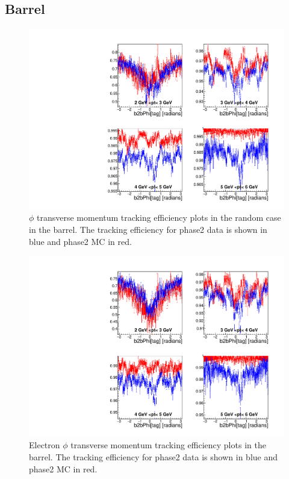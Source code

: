 \documentclass[a4paper,11pt,twosided,final,german,openbib,pdftex,listof=totoc,bibliography=totoc]{scrbook}
\begin{document}
\newpage



\subsection{Barrel}





\begin{figure}[!htbp]
	\centering
	\includegraphics[width=\textwidth]{Plots/master/xPtMPhiRandomBarrel}
	\caption[Transverse Momentum $\phi$ Random Barrel Efficiency Phase2]{$\phi$ transverse momentum tracking efficiency plots in the random case in the barrel. The tracking efficiency for phase2 data is shown in blue and phase2 MC in red.}
\end{figure}



\begin{figure}[!htbp]
	\centering
	\includegraphics[width=\textwidth]{Plots/master/xPtMPhiemBarrel}
	\caption[Transverse Momentum $\phi$ Electron Barrel Efficiency Phase2]{Electron $\phi$ transverse momentum tracking efficiency plots in the barrel. The tracking efficiency for phase2 data is shown in blue and phase2 MC in red.}
\end{figure}
\end{document}
